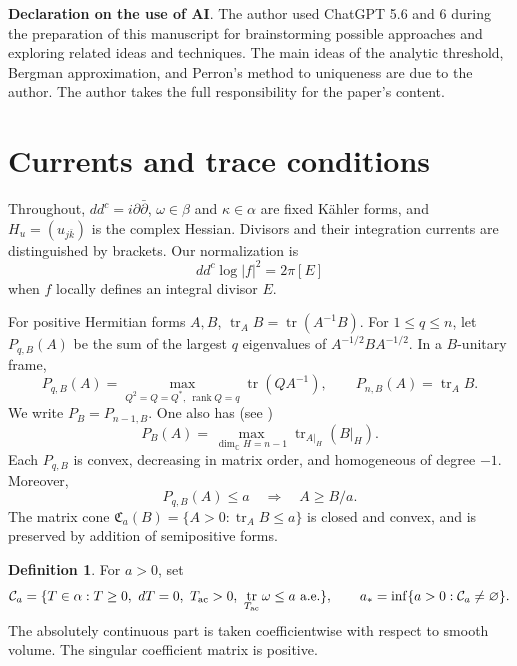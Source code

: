\documentclass[reqno]{amsart}
\numberwithin{equation}{section}
\theoremstyle{definition}
\newtheorem{definition}[theorem]{Definition}
\DeclareMathOperator{\tr}{tr}
\begin{document}
\textbf{Declaration on the use of AI}. The author used ChatGPT 5.6 and 6 during the preparation of this manuscript for brainstorming possible approaches and exploring related ideas and techniques. The main ideas of the analytic threshold, Bergman approximation, and Perron's method to uniqueness are due to the author. The author takes the full responsibility for the paper's content.
\section{Currents and trace conditions}\label{sec:currents}

Throughout, $dd^c=i\partial\bar\partial$, $\omega\in\beta$ and $\kappa\in\alpha$ are fixed K\"ahler forms, and $H_u=(u_{j\bar k})$ is the complex Hessian. Divisors and their integration currents are distinguished by brackets. Our normalization is
\begin{equation}\label{eq:poincare-lelong}
 dd^c\log|f|^2=2\pi[E]
\end{equation}
when $f$ locally defines an integral divisor $E$.

For positive Hermitian forms $A,B$, $\tr_A B=\tr(A^{-1}B)$. For $1\le q\le n$, let $P_{q,B}(A)$ be the sum of the largest $q$ eigenvalues of $A^{-1/2}BA^{-1/2}$. In a $B$-unitary frame,
\begin{equation}\label{eq:partial-traces}
 P_{q,B}(A)=\max_{Q^2=Q=Q^*,\ \operatorname{rank}Q=q}\tr(QA^{-1}),
 \qquad P_{n,B}(A)=\tr_A B.
\end{equation}
We write $P_B=P_{n-1,B}$. One also has (see \cite{C21})
\[
 P_B(A)=\max_{\dim_{\mathbb C}H=n-1}\tr_{A|_H}(B|_H).
\]
Each $P_{q,B}$ is convex, decreasing in matrix order, and homogeneous of degree $-1$. Moreover,
\[
 P_{q,B}(A)\le a\quad\Longrightarrow\quad A\ge B/a.
\]
The matrix cone $\mathfrak C_a(B)=\{A>0:\tr_A B\le a\}$ is closed and convex, and is preserved by addition of semipositive forms.

\begin{definition}\label{def:trace-family}
For $a>0$, set
\begin{equation}\label{eq:trace-family}
 \mathcal C_a=\{T\in\alpha:T\ge0,\ dT=0,\ T_{\rm ac}>0,
                          \ \tr_{T_{\rm ac}}\omega\le a\text{ a.e.}\},
 \qquad a_*=\inf\{a>0:\mathcal C_a\ne\varnothing\}.
\end{equation}
The absolutely continuous part is taken coefficientwise with respect to smooth volume. The singular coefficient matrix is positive.
\end{definition}
\end{document}
